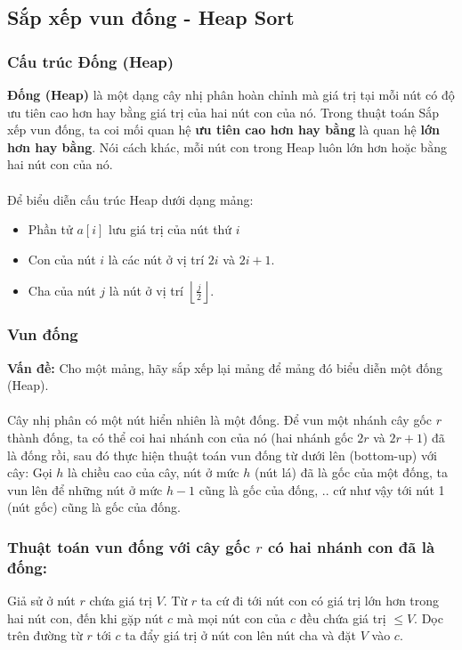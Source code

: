 \documentclass[]{article}
\begin{document}
\subsection{Sắp xếp vun đống - Heap Sort}
\subsubsection{Cấu trúc Đống (Heap)}
\textbf{Đống (Heap)} là một dạng cây nhị phân hoàn chỉnh mà giá trị tại mỗi nút có độ ưu tiên cao hơn hay bằng giá trị của hai nút con của nó. Trong thuật toán Sắp xếp vun đống, ta coi mối quan hệ \textbf{ưu tiên cao hơn hay bằng} là quan hệ \textbf{lớn hơn hay bằng}.\cite{LMHoang} Nói cách khác, mỗi nút con trong Heap luôn lớn hơn hoặc bằng hai nút con của nó.
\\\\
Để biểu diễn cấu trúc Heap dưới dạng mảng:
\begin{itemize}
\item Phần tử $a[i]$ lưu giá trị của nút thứ $i$
\item Con của nút $i$ là các nút ở vị trí $2i$ và $2i + 1$.
\item Cha của nút $j$ là nút ở vị trí $\displaystyle \left\lfloor\frac{j}{2}\right\rfloor$.
\end{itemize}

\subsubsection{Vun đống}
\textbf{Vấn đề:} Cho một mảng, hãy sắp xếp lại mảng để mảng đó biểu diễn một đống (Heap).
\\\\
Cây nhị phân có một nút hiển nhiên là một đống. Để vun một nhánh cây gốc $r$ thành đống, ta có thể coi hai nhánh con của nó (hai nhánh gốc $2r$ và $2r + 1$) đã là đống rồi, sau đó thực hiện thuật toán vun đống từ dưới lên (bottom-up) với cây: Gọi $h$ là chiều cao của cây, nút ở mức $h$ (nút lá) đã là gốc của một đống, ta vun lên để những nút ở mức $h - 1$ cũng là gốc của đống, .. cứ như vậy tới nút 1 (nút gốc) cũng là gốc của đống.\cite{LMHoang}
\subsubsection{Thuật toán vun đống với cây gốc $r$ có hai nhánh con đã là đống:}
Giả sử ở nút $r$ chứa giá trị $V$. Từ $r$ ta cứ đi tới nút con có giá trị lớn hơn trong hai nút con, đến khi gặp nút $c$ mà mọi nút con của $c$ đều chứa giá trị $\leq V$. Dọc trên đường từ $r$ tới $c$ ta đẩy giá trị ở nút con lên nút cha và đặt $V$ vào $c$.\cite{LMHoang}
\end{document}
